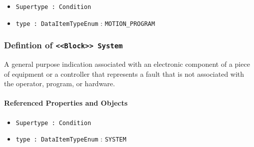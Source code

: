 \begin{itemize}
\item \texttt{Supertype : Condition}

\item \texttt{type : DataItemTypeEnum} : \texttt{MOTION_PROGRAM}

\end{itemize}
\FloatBarrier
\subsubsection{Defintion of \texttt{<<Block>> System}}
  \label{type:System}

\FloatBarrier

A general purpose indication associated with an electronic component of a piece of equipment or a controller that represents a fault that is not associated with the operator, program, or hardware.

\FloatBarrier
\paragraph{Referenced Properties and Objects}

\begin{itemize}
\item \texttt{Supertype : Condition}

\item \texttt{type : DataItemTypeEnum} : \texttt{SYSTEM}

\end{itemize}
\FloatBarrier
